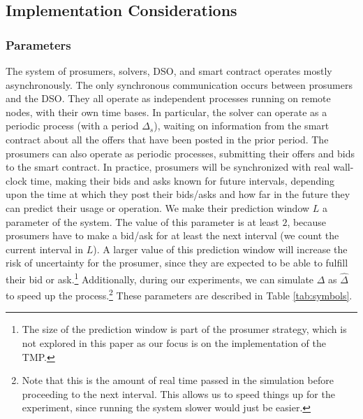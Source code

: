 \subsection{Implementation Considerations}
\label{sec:implementation}

\subsubsection{Parameters} The system of prosumers, solvers, DSO, and smart contract operates mostly asynchronously. The only synchronous communication  occurs between prosumers and the DSO. They all operate as  independent processes running on remote nodes, with their own time bases. In particular, the solver can operate as a periodic process (with a period $\Delta_s$), waiting on information from the smart contract about all the offers that have been posted in the prior period. The prosumers  can also operate as periodic processes, submitting their offers and bids to the smart contract.  In practice, prosumers will be synchronized with real wall-clock time, making their bids and asks known for future intervals, depending upon the time at which they post their bids/asks and how far in the future  they can predict their usage or operation. We make  their prediction window $L$ a parameter of the system. The value of this parameter is at least $2$, because prosumers have to  make a bid/ask for at least the next interval (we count the current interval in $L$). A larger value of this prediction window will increase the risk of uncertainty for the prosumer, since they are expected to be able to fulfill their bid or ask.\footnote{The size of the prediction window is part of the prosumer strategy, which is not explored in this paper as our focus is on the implementation of the TMP.} Additionally, during our experiments, we can simulate $\Delta$ as $\hat{\Delta}$ to speed up the process.\footnote{Note that this is the amount of real time passed in the simulation before proceeding to the next interval. This allows us to speed things up for the experiment, since running the system slower would just be easier.} These parameters are described in Table \ref{tab:symbols}.

